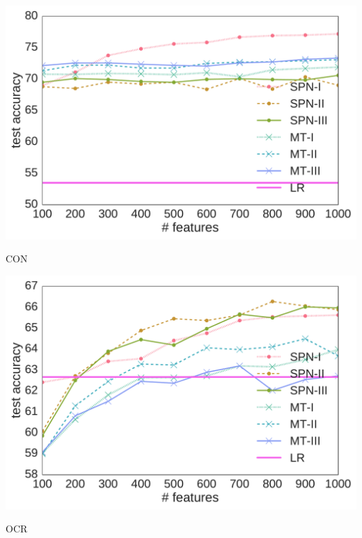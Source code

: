 \documentclass[final]{beamer}
\begin{document}
\begin{frame}{}
\begin{textblock}{80}
\begin{center}
\begin{minipage}[t]{0.2\linewidth}
\begin{center}
          \includegraphics[width=1.0\linewidth]{figures/lines-convex}\par
          \footnotesize\textsf{CON}
        \end{center}
      \end{minipage}\begin{minipage}[t]{0.2\linewidth}
        \begin{center}
          \includegraphics[width=1.0\linewidth]{figures/lines-caltech101}\par
          \footnotesize\textsf{OCR}
        \end{center}
      \end{minipage}\begin{minipage}[t]{0.2\linewidth}
        \begin{center}

\end{center}
\end{minipage}
\end{center}
\end{textblock}
\end{frame}
\end{document}
